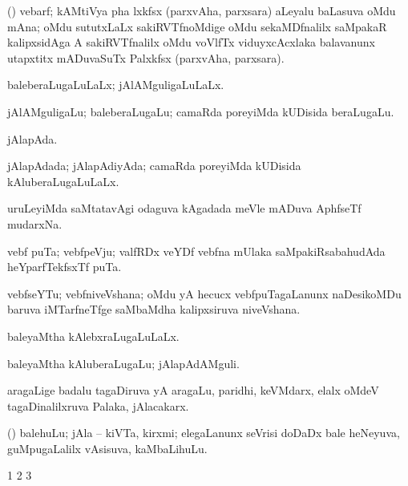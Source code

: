 \bentry
{} 
\gl{\nA}
\expl{}
\bmng
(\Bwvi) vebarf; kAMtiVya pha lxkfsx (parxvAha, parxsara) aLeyalu baLasuva oMdu mAna; oMdu sututxLaLx sakiRVTfnoMdige oMdu sekaMDfnalilx saMpakaR kalipxsidAga A sakiRVTfnalilx oMdu voVlfTx viduyxcAcxlaka balavanunx utapxtitx mADuvaSuTx Palxkfsx (parxvAha, parxsara). 
\emng
\eentry

\bentry
{} 
\gl{\gu}
\expl{}
\bmng
baleberaLugaLuLaLx; jAlAMguligaLuLaLx. 
\emng
\eentry

\bentry
{} 
\gl{\nA}
\expl{}
\bmng
jAlAMguligaLu; baleberaLugaLu; camaRda poreyiMda kUDisida beraLugaLu. 
\emng
\eentry

\bentry
{} 
\gl{\nA}
\expl{}
\bmng
jAlapAda. 
\emng
\eentry

\bentry
{} 
\gl{\gu}
\expl{}
\bmng
jAlapAdada; jAlapAdiyAda; camaRda poreyiMda kUDisida kAluberaLugaLuLaLx. 
\emng
\eentry

\bentry
{} 
\gl{\nA}
\expl{}
\bmng
uruLeyiMda saMtatavAgi odaguva kAgadada meVle mADuva AphfseTf mudarxNa. 
\emng
\eentry

\bentry
{} 
\gl{\nA}
\expl{}
\bmng
vebf puTa; vebfpeVju; valfRDx veYDf vebfna mUlaka saMpakiRsabahudAda heYparfTekfsxTf puTa. 
\emng
\eentry

\bentry
{} 
\gl{\nA}
\expl{}
\bmng
vebfseYTu; vebfniveVshana; oMdu yA hecucx vebfpuTagaLanunx naDesikoMDu baruva iMTarfneTfge saMbaMdha kalipxsiruva niveVshana. 
\emng
\eentry

\bentry
{} 
\gl{\gu}
\expl{}
\bmng
baleyaMtha kAlebxraLugaLuLaLx. 
\emng
\eentry

\bentry
{} 
\gl{\nA}
\expl{}
\bmng
baleyaMtha kAluberaLugaLu; jAlapAdAMguli. 
\emng
\eentry

\bentry
{} 
\gl{\nA}
\expl{}
\bmng
aragaLige badalu tagaDiruva yA aragaLu, paridhi, keVMdarx, elalx oMdeV tagaDinalilxruva Palaka, jAlacakarx. 
\emng
\eentry

\bentry
{} 
\gl{\nA}
\expl{}
\bmng
(\ame) balehuLu; jAla -- kiVTa, kirxmi; elegaLanunx seVrisi doDaDx bale heNeyuva, guMpugaLalilx vAsisuva, kaMbaLihuLu. 
\emng
\eentry

\bentry
{} 
\expl{}
\bmng
\bnum
\num{1}  
\num{2}  
\num{3}  
\enum
\emng
\eentry

